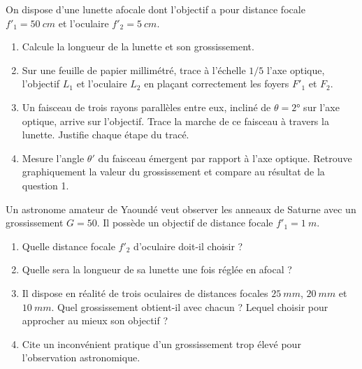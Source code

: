 \documentclass[11pt]{article}
\newcounter{popsec}
\newcounter{popsub}
\newcommand{\courssub}[1]{%
  \stepcounter{popsub}%
  \par\vspace{9pt}\noindent{\popxbold\fontsize{11.5}{13}\selectfont\color{popink}{\color{poporange}\thepopsec.\thepopsub}\hspace{6pt}#1}\par\nopagebreak\vspace{4pt}
}
\begin{document}
\courssub{Je m'entraîne}

\begin{exercice}
On dispose d'une lunette afocale dont l'objectif a pour distance focale $f'_1 = \SI{50}{cm}$ et l'oculaire $f'_2 = \SI{5}{cm}$.
\begin{enumerate}
\item Calcule la longueur de la lunette et son grossissement.
\item Sur une feuille de papier millimétré, trace à l'échelle $1/5$ l'axe optique, l'objectif $L_1$ et l'oculaire $L_2$ en plaçant correctement les foyers $F'_1$ et $F_2$.
\item Un faisceau de trois rayons parallèles entre eux, incliné de $\theta = 2°$ sur l'axe optique, arrive sur l'objectif. Trace la marche de ce faisceau à travers la lunette. Justifie chaque étape du tracé.
\item Mesure l'angle $\theta'$ du faisceau émergent par rapport à l'axe optique. Retrouve graphiquement la valeur du grossissement et compare au résultat de la question 1.
\end{enumerate}
\end{exercice}

\begin{exercice}
Un astronome amateur de Yaoundé veut observer les anneaux de Saturne avec un grossissement $G = 50$. Il possède un objectif de distance focale $f'_1 = \SI{1}{m}$.
\begin{enumerate}
\item Quelle distance focale $f'_2$ d'oculaire doit-il choisir ?
\item Quelle sera la longueur de sa lunette une fois réglée en afocal ?
\item Il dispose en réalité de trois oculaires de distances focales $\SI{25}{mm}$, $\SI{20}{mm}$ et $\SI{10}{mm}$. Quel grossissement obtient-il avec chacun ? Lequel choisir pour approcher au mieux son objectif ?
\item Cite un inconvénient pratique d'un grossissement trop élevé pour l'observation astronomique.
\end{enumerate}
\end{exercice}
\end{document}

